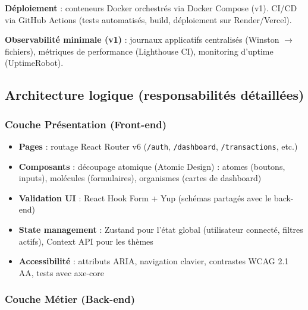 \textbf{Déploiement} : conteneurs Docker orchestrés via Docker Compose (v1). CI/CD via GitHub Actions (tests automatisés, build, déploiement sur Render/Vercel).

\textbf{Observabilité minimale (v1)} : journaux applicatifs centralisés (Winston $\rightarrow$ fichiers), métriques de performance (Lighthouse CI), monitoring d'uptime (UptimeRobot).

\subsection{Architecture logique (responsabilités détaillées)}

\subsubsection{Couche Présentation (Front-end)}

\begin{itemize}
  \item \textbf{Pages} : routage React Router v6 (\texttt{/auth}, \texttt{/dashboard}, \texttt{/transactions}, etc.)
  \item \textbf{Composants} : découpage atomique (Atomic Design) : atomes (boutons, inputs), molécules (formulaires), organismes (cartes de dashboard)
  \item \textbf{Validation UI} : React Hook Form + Yup (schémas partagés avec le back-end)
  \item \textbf{State management} : Zustand pour l'état global (utilisateur connecté, filtres actifs), Context API pour les thèmes
  \item \textbf{Accessibilité} : attributs ARIA, navigation clavier, contrastes WCAG 2.1 AA, tests avec axe-core
\end{itemize}

\subsubsection{Couche Métier (Back-end)}

